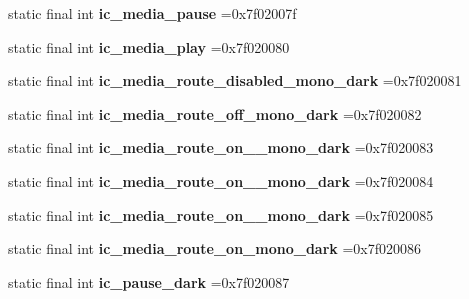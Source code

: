 \begin{DoxyCompactItemize}
static final int {\bfseries ic\+\_\+media\+\_\+pause} =0x7f02007f
\item 
\mbox{\label{classproject4_1_1xaria_1_1R_1_1drawable_ad89ccd6251cc6440016de42e913a3ded}} 
static final int {\bfseries ic\+\_\+media\+\_\+play} =0x7f020080
\item 
\mbox{\label{classproject4_1_1xaria_1_1R_1_1drawable_ad953edb758d6097a8cfd562d199f2d57}} 
static final int {\bfseries ic\+\_\+media\+\_\+route\+\_\+disabled\+\_\+mono\+\_\+dark} =0x7f020081
\item 
\mbox{\label{classproject4_1_1xaria_1_1R_1_1drawable_aa26fc5b370ec930b504cb649594f7987}} 
static final int {\bfseries ic\+\_\+media\+\_\+route\+\_\+off\+\_\+mono\+\_\+dark} =0x7f020082
\item 
\mbox{\label{classproject4_1_1xaria_1_1R_1_1drawable_af3308623b4af8fef5dd5cd250082b1b1}} 
static final int {\bfseries ic\+\_\+media\+\_\+route\+\_\+on\+\_\+\_\+mono\+\_\+dark} =0x7f020083
\item 
\mbox{\label{classproject4_1_1xaria_1_1R_1_1drawable_ac19d07e515fd073861a13a20b9000f8f}} 
static final int {\bfseries ic\+\_\+media\+\_\+route\+\_\+on\+\_\+\_\+mono\+\_\+dark} =0x7f020084
\item 
\mbox{\label{classproject4_1_1xaria_1_1R_1_1drawable_aa4ed4dfe85710546ac10a33c6c762a04}} 
static final int {\bfseries ic\+\_\+media\+\_\+route\+\_\+on\+\_\+\_\+mono\+\_\+dark} =0x7f020085
\item 
\mbox{\label{classproject4_1_1xaria_1_1R_1_1drawable_a172676451a70d6cff56e0689557c06f9}} 
static final int {\bfseries ic\+\_\+media\+\_\+route\+\_\+on\+\_\+mono\+\_\+dark} =0x7f020086
\item 
\mbox{\label{classproject4_1_1xaria_1_1R_1_1drawable_ac21760bb2160a21abefd644cd44747cc}} 
static final int {\bfseries ic\+\_\+pause\+\_\+dark} =0x7f020087
\item 

\end{DoxyCompactItemize}
